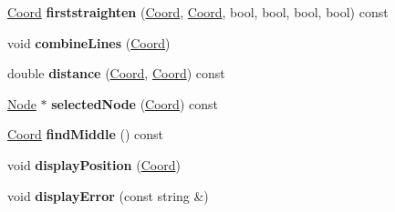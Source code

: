 \begin{DoxyCompactItemize}
\item 
\hypertarget{classGameGUI_a4900be71f21cecf0aafca9d9201b7c77}{\hyperlink{structCoord}{Coord} {\bfseries firststraighten} (\hyperlink{structCoord}{Coord}, \hyperlink{structCoord}{Coord}, bool, bool, bool, bool) const }\label{classGameGUI_a4900be71f21cecf0aafca9d9201b7c77}

\item 
\hypertarget{classGameGUI_aa12fbbd12f46981f02e78fbfd2a5d404}{void {\bfseries combine\+Lines} (\hyperlink{structCoord}{Coord})}\label{classGameGUI_aa12fbbd12f46981f02e78fbfd2a5d404}

\item 
\hypertarget{classGameGUI_ada539abb78b785c11172aa9bf4dfabf6}{double {\bfseries distance} (\hyperlink{structCoord}{Coord}, \hyperlink{structCoord}{Coord}) const }\label{classGameGUI_ada539abb78b785c11172aa9bf4dfabf6}

\item 
\hypertarget{classGameGUI_ac927454c0511580c102ddc739fd9a6df}{\hyperlink{structNode}{Node} $\ast$ {\bfseries selected\+Node} (\hyperlink{structCoord}{Coord}) const }\label{classGameGUI_ac927454c0511580c102ddc739fd9a6df}

\item 
\hypertarget{classGameGUI_a597ba4a997c9aca9d765ce1b43613001}{\hyperlink{structCoord}{Coord} {\bfseries find\+Middle} () const }\label{classGameGUI_a597ba4a997c9aca9d765ce1b43613001}

\item 
\hypertarget{classGameGUI_a346606e8f741b3fad9d9fcccdd4b4a5b}{void {\bfseries display\+Position} (\hyperlink{structCoord}{Coord})}\label{classGameGUI_a346606e8f741b3fad9d9fcccdd4b4a5b}

\item 
\hypertarget{classGameGUI_a414dd5716a93388919d89ca82ffb1d23}{void {\bfseries display\+Error} (const string \&)}\label{classGameGUI_a414dd5716a93388919d89ca82ffb1d23}

\end{DoxyCompactItemize}
